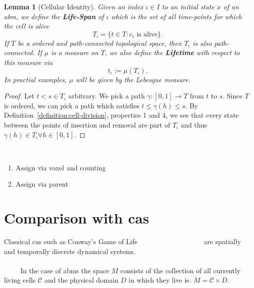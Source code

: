 \documentclass{article}
\newcommand{\todo}[1]{\colorbox{WildStrawberry}{\textcolor{white}{#1}}}
\newtheorem{lemma}[definition]{Lemma}
\begin{document}
\begin{lemma}[Cellular Identity]
    \label{thm:cellular-uniqueness}
    Given an index $\iota\in I$ to an initial state $x$ of an \ac{abm}, we define the
    \textbf{Life-Span} of $\iota$ which is the set of all time-points for which the cell is alive
    \begin{equation}
        T_\iota=\{t\in T: c_\iota \text{ is alive}\}.
    \end{equation}
    If $T$ be a ordered and path-connected topological space, then $T_\iota$ is also path-connected.
    If $\mu$ is a measure on $T$, we also define the \textbf{Lifetime} with respect to this measure
    via
    \begin{equation}
        t_\iota:=\mu\left(T_\iota\right).
    \end{equation}
    In practial examples, $\mu$ will be given by the Lebesgue measure.
\end{lemma}
\begin{proof}
    Let $t<s\in T_\iota$ arbitrary.
    We pick a path $\gamma:[0,1]\rightarrow T$ from $t$ to $s$.
    Since $T$ is ordered, we can pick a path which satisfies $t\leq\gamma(h)\leq s$.
    By Definition~\ref{definition:cell-division}, properties 1 and 4, we see that every state
    between the points of insertion and removal are part of $T_\iota$ and thus
    $\gamma(h)\in T_\iota\forall h\in [0,1]$.
\end{proof}

\todo{practial implementations of Index choosing}
\begin{enumerate}
    \item Assign via voxel and counting
    \item Assign via parent
\end{enumerate}

\section{Comparison with \aclp{ca}}
\label{section:comparison-with-ca}
Classical \acp{ca} such as Conway's Game of Life \cite{games1970fantastic} \todo{MORE CITATIONS}
are spatially and temporally discrete dynamical systems.
\todo{More details about \acp{ca}}
\todo{Cells are not tracable through time and space}
\todo{division and death}
\todo{distinction to migration not clear}
In the case of \acp{abm} the space $M$ consists of the collection of all currently living cells
$\mathscr{C}$ and the physical domain $D$ in which they live ie. $M=\mathscr{C}\times D$.
\end{document}
